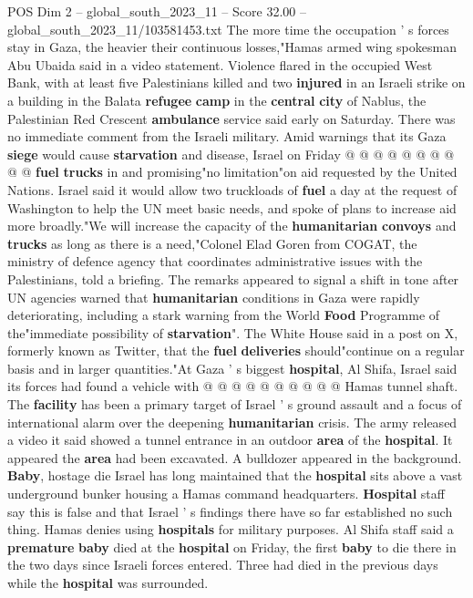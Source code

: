 \begin{textsample}{POS Dim 2 – global\_south\_2023\_11 – Score 32.00 – global\_south\_2023\_11/103581453.txt}
The more time the occupation ' s forces stay in Gaza, the heavier their continuous losses,"Hamas armed wing spokesman Abu Ubaida said in a video statement.
Violence flared in the occupied West Bank, with at least five Palestinians killed and two \textbf{injured} in an Israeli strike on a building in the Balata \textbf{refugee} \textbf{camp} in the \textbf{central} \textbf{city} of Nablus, the Palestinian Red Crescent \textbf{ambulance} service said early on Saturday.
There was no immediate comment from the Israeli military.
Amid warnings that its Gaza \textbf{siege} would cause \textbf{starvation} and disease, Israel on Friday @ @ @ @ @ @ @ @ @ @ \textbf{fuel} \textbf{trucks} in and promising"no limitation"on aid requested by the United Nations.
Israel said it would allow two truckloads of \textbf{fuel} a day at the request of Washington to help the UN meet basic needs, and spoke of plans to increase aid more broadly."We will increase the capacity of the \textbf{humanitarian} \textbf{convoys} and \textbf{trucks} as long as there is a need,"Colonel Elad Goren from COGAT, the ministry of defence agency that coordinates administrative issues with the Palestinians, told a briefing.
The remarks appeared to signal a shift in tone after UN agencies warned that \textbf{humanitarian} conditions in Gaza were rapidly deteriorating, including a stark warning from the World \textbf{Food} Programme of the"immediate possibility of \textbf{starvation}".
The White House said in a post on X, formerly known as Twitter, that the \textbf{fuel} \textbf{deliveries} should"continue on a regular basis and in larger quantities."At Gaza ' s biggest \textbf{hospital}, Al Shifa, Israel said its forces had found a vehicle with @ @ @ @ @ @ @ @ @ @ Hamas tunnel shaft.
The \textbf{facility} has been a primary target of Israel ' s ground assault and a focus of international alarm over the deepening \textbf{humanitarian} crisis.
The army released a video it said showed a tunnel entrance in an outdoor \textbf{area} of the \textbf{hospital}.
It appeared the \textbf{area} had been excavated.
A bulldozer appeared in the background. \textbf{Baby}, hostage die Israel has long maintained that the \textbf{hospital} sits above a vast underground bunker housing a Hamas command headquarters. \textbf{Hospital} staff say this is false and that Israel ' s findings there have so far established no such thing.
Hamas denies using \textbf{hospitals} for military purposes.
Al Shifa staff said a \textbf{premature} \textbf{baby} died at the \textbf{hospital} on Friday, the first \textbf{baby} to die there in the two days since Israeli forces entered.
Three had died in the previous days while the \textbf{hospital} was surrounded.

\end{textsample}

